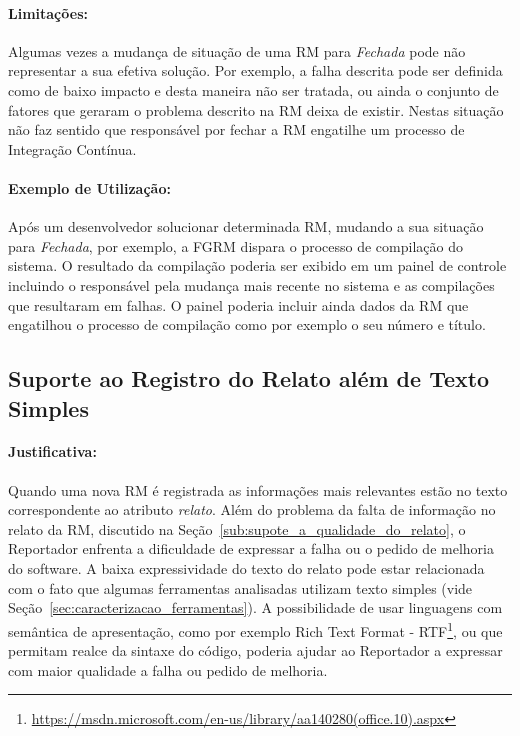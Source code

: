 \paragraph{Limitações:}\label{par:limitacoes_s05}

Algumas vezes a mudança de situação de uma RM para \textit{Fechada} pode não
representar a sua efetiva solução. Por exemplo, a falha descrita pode ser
definida como de baixo impacto e desta maneira não ser tratada, ou ainda o
conjunto de fatores que geraram o problema descrito na RM deixa de existir.
Nestas situação não faz sentido que responsável por fechar a RM engatilhe um
processo de Integração Contínua.

\paragraph{Exemplo de Utilização:}\label{par:exemplo_de_utilização_s05}

Após um desenvolvedor solucionar determinada RM, mudando a sua situação para
\textit{Fechada}, por exemplo, a FGRM dispara o processo de compilação do
sistema. O resultado da compilação poderia ser exibido em um painel de controle
incluindo o responsável pela mudança mais recente no sistema e as compilações
que resultaram em falhas. O painel poderia incluir ainda dados da RM que
engatilhou o processo de compilação como por exemplo o seu número e título.

\subsection{Suporte ao Registro do Relato além de Texto Simples}\label{sub:suporte_linguagem_marcacao}


\paragraph{Justificativa:}\label{par:justificativa_s06}

Quando uma nova RM é registrada as informações mais relevantes estão no texto
correspondente ao atributo \textit{relato}. Além do problema da falta de
informação no relato da RM, discutido na
Seção~\ref{sub:supote_a_qualidade_do_relato}, o Reportador enfrenta a
dificuldade de expressar a falha ou o pedido de melhoria do software. A baixa
expressividade do texto do relato pode estar relacionada com o fato que algumas
ferramentas analisadas utilizam texto simples (vide
Seção~\ref{sec:caracterizacao_ferramentas}). A possibilidade de usar linguagens
com semântica de apresentação, como por exemplo Rich Text Format \@-\@
RTF\footnote{\url{https://msdn.microsoft.com/en-us/library/aa140280(office.10).aspx}},
ou que permitam realce da sintaxe do código, poderia ajudar ao Reportador a
expressar com maior qualidade a falha ou pedido de melhoria.


